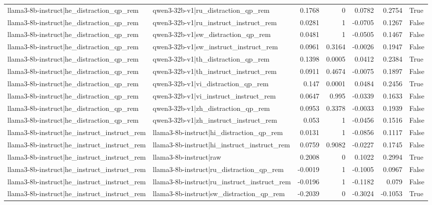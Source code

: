 \begin{table}
\begin{tabular}{l l r r r r l}
llama3-8b-instruct|he_distraction_qp_rem & qwen3-32b-v1|ru_distraction_qp_rem & 0.1768 & 0 & 0.0782 & 0.2754 & True \\
llama3-8b-instruct|he_distraction_qp_rem & qwen3-32b-v1|ru_instruct_instruct_rem & 0.0281 & 1 & -0.0705 & 0.1267 & False \\
llama3-8b-instruct|he_distraction_qp_rem & qwen3-32b-v1|sw_distraction_qp_rem & 0.0481 & 1 & -0.0505 & 0.1467 & False \\
llama3-8b-instruct|he_distraction_qp_rem & qwen3-32b-v1|sw_instruct_instruct_rem & 0.0961 & 0.3164 & -0.0026 & 0.1947 & False \\
llama3-8b-instruct|he_distraction_qp_rem & qwen3-32b-v1|th_distraction_qp_rem & 0.1398 & 0.0005 & 0.0412 & 0.2384 & True \\
llama3-8b-instruct|he_distraction_qp_rem & qwen3-32b-v1|th_instruct_instruct_rem & 0.0911 & 0.4674 & -0.0075 & 0.1897 & False \\
llama3-8b-instruct|he_distraction_qp_rem & qwen3-32b-v1|vi_distraction_qp_rem & 0.147 & 0.0001 & 0.0484 & 0.2456 & True \\
llama3-8b-instruct|he_distraction_qp_rem & qwen3-32b-v1|vi_instruct_instruct_rem & 0.0647 & 0.995 & -0.0339 & 0.1633 & False \\
llama3-8b-instruct|he_distraction_qp_rem & qwen3-32b-v1|zh_distraction_qp_rem & 0.0953 & 0.3378 & -0.0033 & 0.1939 & False \\
llama3-8b-instruct|he_distraction_qp_rem & qwen3-32b-v1|zh_instruct_instruct_rem & 0.053 & 1 & -0.0456 & 0.1516 & False \\
llama3-8b-instruct|he_instruct_instruct_rem & llama3-8b-instruct|hi_distraction_qp_rem & 0.0131 & 1 & -0.0856 & 0.1117 & False \\
llama3-8b-instruct|he_instruct_instruct_rem & llama3-8b-instruct|hi_instruct_instruct_rem & 0.0759 & 0.9082 & -0.0227 & 0.1745 & False \\
llama3-8b-instruct|he_instruct_instruct_rem & llama3-8b-instruct|raw & 0.2008 & 0 & 0.1022 & 0.2994 & True \\
llama3-8b-instruct|he_instruct_instruct_rem & llama3-8b-instruct|ru_distraction_qp_rem & -0.0019 & 1 & -0.1005 & 0.0967 & False \\
llama3-8b-instruct|he_instruct_instruct_rem & llama3-8b-instruct|ru_instruct_instruct_rem & -0.0196 & 1 & -0.1182 & 0.079 & False \\
llama3-8b-instruct|he_instruct_instruct_rem & llama3-8b-instruct|sw_distraction_qp_rem & -0.2039 & 0 & -0.3024 & -0.1053 & True \\

\end{tabular}
\end{table}
